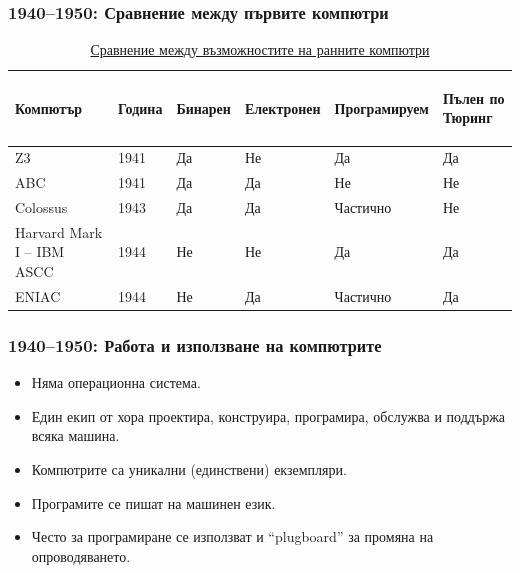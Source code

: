 \documentclass[ignorenonframetext, hyperref=unicode]{beamer}
\begin{document}
\begin{frame}
\frametitle{1940--1950: Сравнение между първите компютри}
\begin{center}
\vfill
\begin{table}
\begin{supertabular}{|l|l|l|l|l|l|}
Компютър  & Година & \hfill\begin{rotate}{90}Бинарен\end{rotate}\hfil&
\hfill\begin{rotate}{90}Електронен\end{rotate} &
\hfill\begin{rotate}{90}Програмируем\end{rotate} &
\hfill\begin{rotate}{90}Пълен по Тюринг\end{rotate}\\
\hline
Z3 & 1941 & Да & Не & Да & Да \\
ABC & 1941 & Да & Да & Не & Не \\
Colossus & 1943 & Да & Да & Частично & Не \\
Harvard Mark I -- IBM ASCC & 1944 & Не & Не & Да & Да \\
ENIAC & 1944 & Не & Да & Частично & Да \\
\hline
\end{supertabular}
\caption{\href{http://en.wikipedia.org/wiki/Z3\#How_the_Z3_relates_to_other_work}{Сравнение 
между възможностите на ранните компютри}}

\end{table}
\end{center}
\end{frame}

\begin{frame}
\frametitle{1940--1950: Работа и използване на компютрите}
\begin{itemize}
  \item Няма операционна система.
  \item Един екип от хора проектира, конструира, програмира, обслужва и
  поддържа всяка машина. 
  \item Компютрите са уникални (единствени) екземпляри.
  \item Програмите се пишат на машинен език. 
  \item Често за програмиране се използват и ``plugboard'' за промяна на
  опроводяването. 
\end{itemize}
\end{frame}
\end{document}
